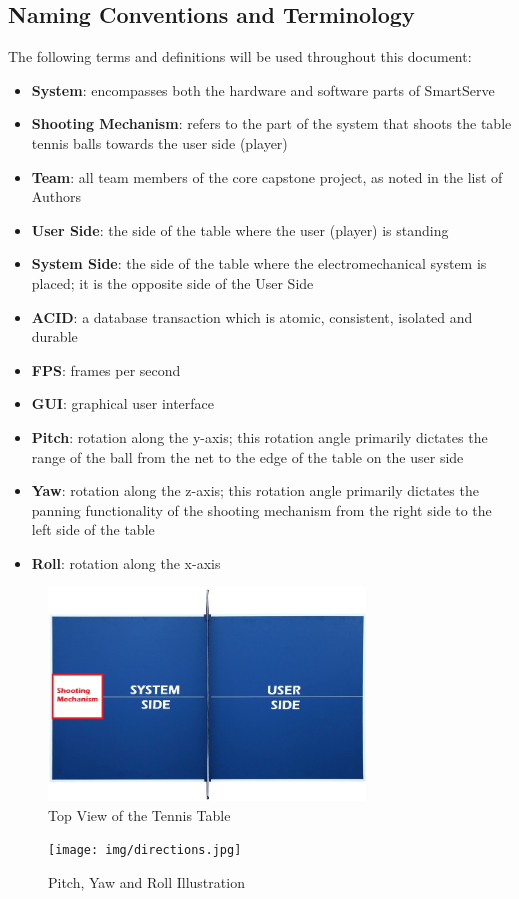 \documentclass[11pt]{article}
\begin{document}
\subsection{Naming Conventions and Terminology}
\label{sec:definitions}
The following terms and definitions will be used throughout this document:
\begin{itemize}
\item \textbf{System}: encompasses both the hardware and software parts of SmartServe
\item \textbf{Shooting Mechanism}: refers to the part of the system that shoots the table tennis balls towards the user side (player)
\item \textbf{Team}: all team members of the core capstone project, as noted in the list of Authors
\item \textbf{User Side}: the side of the table where the user (player) is standing
\item \textbf{System Side}: the side of the table where the electromechanical system is placed; it is the opposite side of the User Side
\item \textbf{ACID}: a database transaction which is atomic, consistent, isolated and durable
\item \textbf{FPS}: frames per second
\item \textbf{GUI}: graphical user interface
\item \textbf{Pitch}: rotation along the y-axis; this rotation angle primarily dictates the range of the ball from the net to the edge of the table on the user side
\item \textbf{Yaw}: rotation along the z-axis; this rotation angle primarily dictates the panning functionality of the shooting mechanism from the right side to the left side of the table
\item \textbf{Roll}: rotation along the x-axis
\end{itemize}
\begin{figure}[H]
   \centering
   \includegraphics[width=0.75\textwidth]{img/Table-Tennis-Top-View.png} %
   \caption{Top View of the Tennis Table}
   \label{fig:table-tennis-top-view}
\end{figure}
\begin{figure}[H]
   \centering
   \texttt{[image: img/directions.jpg]} %
   \caption{Pitch, Yaw and Roll Illustration}
   \label{fig:pitch_yaw_roll_diagram}
\end{figure}
\end{document}
